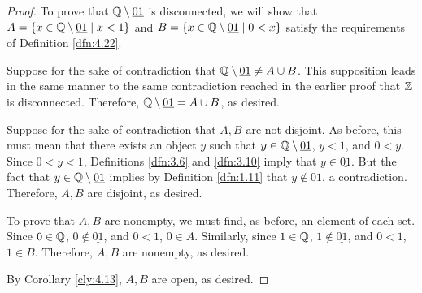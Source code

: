 \documentclass[../main.tex]{subfiles}
\begin{document}
\begin{exercise}
\begin{proof}
        To prove that $\mathbb{Q}\setminus\underline{01}$ is disconnected, we will show that $A=\{x\in\mathbb{Q}\setminus\underline{01}\mid x<1\}$ and $B=\{x\in\mathbb{Q}\setminus\underline{01}\mid 0<x\}$ satisfy the requirements of Definition \ref{dfn:4.22}.\par
        Suppose for the sake of contradiction that $\mathbb{Q}\setminus\underline{01}\neq A\cup B$. This supposition leads in the same manner to the same contradiction reached in the earlier proof that $\mathbb{Z}$ is disconnected. Therefore, $\mathbb{Q}\setminus\underline{01}=A\cup B$, as desired.\par
        Suppose for the sake of contradiction that $A,B$ are not disjoint. As before, this must mean that there exists an object $y$ such that $y\in\mathbb{Q}\setminus\underline{01}$, $y<1$, and $0<y$. Since $0<y<1$, Definitions \ref{dfn:3.6} and \ref{dfn:3.10} imply that $y\in\underline{01}$. But the fact that $y\in\mathbb{Q}\setminus\underline{01}$ implies by Definition \ref{dfn:1.11} that $y\notin\underline{01}$, a contradiction. Therefore, $A,B$ are disjoint, as desired.\par
        To prove that $A,B$ are nonempty, we must find, as before, an element of each set. Since $0\in\mathbb{Q}$, $0\notin\underline{01}$, and $0<1$, $0\in A$. Similarly, since $1\in\mathbb{Q}$, $1\notin\underline{01}$, and $0<1$, $1\in B$. Therefore, $A,B$ are nonempty, as desired.\par
        By Corollary \ref{cly:4.13}, $A,B$ are open, as desired.
    \end{proof}
\end{exercise}
\end{document}
